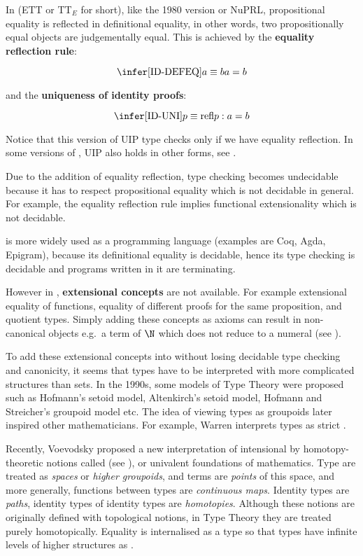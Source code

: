 In \ett (ETT or TT$_E$ for short), like the 1980 version \cite{martin1984intuitionistic} or NuPRL, propositional equality is reflected in definitional equality, in other words, two propositionally equal objects are judgementally equal. This is achieved by the \textbf{equality reflection rule}:

\begin{equation}
\label{reflection}
\infer[\text{ID-DEFEQ}]{a \equiv b}{a = b}
\end{equation}

and the \textbf{uniqueness of identity proofs}:

\begin{equation}
\label{ID-Uni}
\infer[\text{ID-UNI}]{p \equiv \text{refl}}{p : a = b}
\end{equation}

Notice that this version of UIP type checks only if we have equality reflection. In some versions of \itt, UIP also holds in other forms, see . 

Due to the addition of equality reflection, type checking becomes undecidable because it has to respect propositional equality which is not decidable in general. For example, the equality reflection rule implies functional extensionality which is not decidable.

\itt is more widely used as a programming language (examples are Coq, Agda, Epigram), because its definitional equality is decidable, hence its type checking is decidable and programs written in it are terminating.

However in \itt, \textbf{extensional concepts} are not available. For example extensional equality of functions, equality of different proofs for the same proposition, and quotient types. Simply adding these concepts as axioms can result in non-canonical objects e.g.\ a term of $\N$ which does not reduce to a numeral (see ). 


To add these extensional concepts into \itt without losing decidable type checking and canonicity, it seems that types have to be interpreted with more complicated structures than sets.
In the 1990s, some models of Type Theory were proposed such as Hofmann's setoid model, Altenkirch's setoid model, Hofmann and Streicher's groupoid model etc.
The idea of viewing types as groupoids later inspired other mathematicians. For example, Warren \cite{Warren} interprets types as strict \og.

Recently, Voevodsky proposed a new interpretation of intensional \mltt by homotopy-theoretic notions \cite{klv:ssetmodel,voe:06} called \hott (see ), or univalent foundations of mathematics. 
Type are treated as \emph{spaces} or \emph{higher groupoids}, and terms are \emph{points} of this space, and more generally, functions between types are \emph{continuous maps}. Identity types are \emph{paths}, identity types of identity types are \emph{homotopies}. Although these notions are originally defined with topological notions, in Type Theory they are treated purely homotopically. Equality is internalised as a type so that types have infinite levels of higher structures as \wog.


